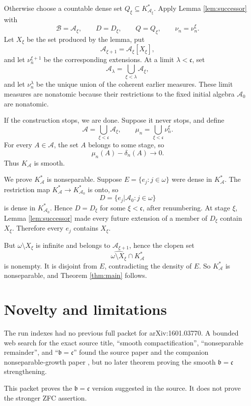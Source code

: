\documentclass[11pt]{amsart}
\theoremstyle{definition}
\newcommand{\A}{\mathcal A}
\newcommand{\B}{\mathcal B}
\newcommand{\bc}{\mathfrak c}
\newcommand{\bb}{\mathfrak b}
\newcommand{\wh}{\widehat}
\begin{document}
Otherwise choose a countable dense set \(Q_\xi\subseteq K_{\A_\xi}^*\).  Apply
Lemma \ref{lem:successor} with
\[
        \B=\A_\xi,\qquad D=D_\xi,\qquad Q=Q_\xi,
        \qquad \nu_n=\nu_n^\xi .
\]
Let \(X_\xi\) be the set produced by the lemma, put
\[
        \A_{\xi+1}=\A_\xi[X_\xi],
\]
and let \(\nu_n^{\xi+1}\) be the corresponding extensions.  At a limit
\(\lambda<\bc\), set
\[
        \A_\lambda=\bigcup_{\xi<\lambda}\A_\xi,
\]
and let \(\nu_n^\lambda\) be the unique union of the coherent earlier measures.
These limit measures are nonatomic because their restrictions to the fixed
initial algebra \(\A_0\) are nonatomic.

If the construction stops, we are done.  Suppose it never stops, and define
\[
        \A=\bigcup_{\xi<\bc}\A_\xi,\qquad
        \mu_n=\bigcup_{\xi<\bc}\nu_n^\xi .
\]
For every \(A\in\A\), the set \(A\) belongs to some stage, so
\[
        \mu_n(A)-\delta_n(A)\to0.
\]
Thus \(K_\A\) is smooth.

We prove \(K_\A^*\) is nonseparable.  Suppose \(E=\{e_j:j\in\omega\}\) were
dense in \(K_\A^*\).  The restriction map \(K_\A^*\to K_{\A_0}^*\) is onto, so
\[
        D=\{e_j|\A_0:j\in\omega\}
\]
is dense in \(K_{\A_0}^*\).  Hence \(D=D_\xi\) for some \(\xi<\bc\), after
renumbering.  At stage \(\xi\), Lemma \ref{lem:successor} made every future
extension of a member of \(D_\xi\) contain \(X_\xi\).  Therefore every
\(e_j\) contains \(X_\xi\).

But \(\omega\setminus X_\xi\) is infinite and belongs to \(\A_{\xi+1}\), hence
the clopen set
\[
        \wh{\omega\setminus X_\xi}\cap K_\A^*
\]
is nonempty.  It is disjoint from \(E\), contradicting the density of \(E\).
So \(K_\A^*\) is nonseparable, and Theorem \ref{thm:main} follows.

\section*{Novelty and limitations}

The run indexes had no previous full packet for arXiv:1601.03770.  A bounded
web search for the exact source title, ``smooth compactification'',
``nonseparable remainder'', and ``\(\bb=\bc\)'' found the source paper
\cite{DP2016} and the companion nonseparable-growth paper \cite{DP2015}, but no
later theorem proving the smooth \(\bb=\bc\) strengthening.

This packet proves the \(\bb=\bc\) version suggested in the source.  It does
not prove the stronger ZFC assertion.
\end{document}
